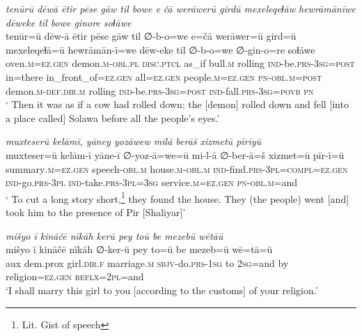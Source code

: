 \ea \label{ŽP.201}
\textit{tenūrū dēwā ētir pēse gāw til bowe e čā werāwerū girdū mexeleqeɫāw hewrāmānīwe dēweke til bowe ginore soɫāwe} \\ 
\gll tenūr=ū dēw-ā ētir pēse gāw til ∅-b-o=we e=čā werāwer=ū gird=ū mexeleqeɫā=ū hewrāmān-ī=we dēw-eke til ∅-b-o=we ∅-gin-o=re soɫāwe \\ 
 oven\textsc{.m}\textsc{\textsc{=ez.gen}} demon\textsc{.m}\textsc{-obl}\textsc{.pl} \textsc{disc.ptcl} as\_if bull\textsc{.m} rolling \textsc{ind-}be\textsc{.prs}\textsc{-3sg}\textsc{=\textsc{post}} in=there in\_front\_of\textsc{\textsc{=ez.gen}} all\textsc{\textsc{=ez.gen}} people\textsc{.m}\textsc{\textsc{=ez.gen}} \textsc{pn}\textsc{-obl}\textsc{.m}\textsc{=\textsc{post}} demon\textsc{.m}\textsc{-def}\textsc{.dir}\textsc{.m} rolling \textsc{ind-}be\textsc{.prs}\textsc{-3sg}\textsc{=\textsc{post}} \textsc{ind-}fall\textsc{.prs}\textsc{-3sg}\textsc{=\textsc{povb}} \textsc{pn} \\ 
\glt ` Then it was as if a cow had rolled down; the [demon] rolled down and fell [into a place called] Solawa before all the people’s eyes.'
\z 
 
\ea \label{ŽP.205}
\textit{muxteserū kelāmī, yāney yozāwew milā berāš xizmetū pīrīyū} \\ 
\gll muxteser=ū kelām-ī yāne-ī ∅-yoz-ā=we=ū mi-l-ā ∅-ber-ā=š xizmet=ū pīr-ī=ū \\ 
 summary\textsc{.m}\textsc{\textsc{=ez.gen}} speech\textsc{-obl}\textsc{.m} house\textsc{.m}\textsc{-obl}\textsc{.m} \textsc{ind-}find\textsc{.prs}\textsc{-3pl}\textsc{=compl}\textsc{\textsc{=ez.gen}} \textsc{ind-}go\textsc{.prs}\textsc{-3pl} \textsc{ind-}take\textsc{.prs}\textsc{-3pl}\textsc{=3sg} service\textsc{.m}\textsc{\textsc{=ez.gen}} \textsc{pn}\textsc{-obl}\textsc{.m}=and \\ 
\glt ` To cut a long story short,\footnote{Lit. Gist of speech} they found the house. They (the people) went [and] took him to the presence of Pir [Shaliyar]'
\z 
 
\ea \label{ŽP.207}
\textit{mišyo ī kināčē nīkāh kerū pey toū be mezebū wētāū} \\ 
\gll mišyo ī kināčē nīkāh ∅-ker-ū pey to=ū be mezeb=ū wē=tā=ū \\ 
 aux dem.prox girl\textsc{.dir}\textsc{.f} marriage\textsc{.m} \textsc{sbjv-}do\textsc{.prs}\textsc{-\textsc{1sg}} to \textsc{2sg}=and by religion\textsc{\textsc{=ez.gen}} \textsc{reflx}=\textsc{2pl}=and \\ 
\glt `I shall marry this girl to you [according to the customs] of your religion.'
\z 
 
